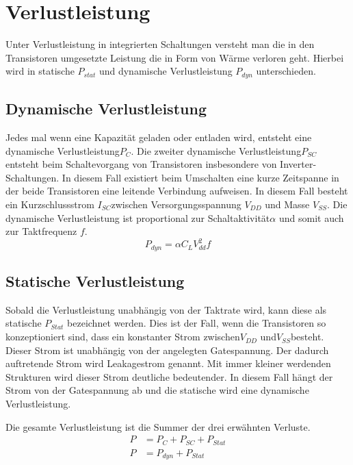 \section{Verlustleistung}
\label{sec:verlustleistung}
Unter Verlustleistung in integrierten Schaltungen versteht man die in den Transistoren umgesetzte Leistung die in Form von Wärme verloren geht.
Hierbei wird in statische \(P_{stat}\) und dynamische Verlustleistung \(P_{dyn}\) unterschieden. 
\subsection{Dynamische Verlustleistung}\label{subsec:dynVerl}
Jedes mal wenn eine Kapazität geladen oder entladen wird, entsteht eine dynamische Verlustleistung\(P_C\). Die zweiter dynamische Verlustleistung\(P_{SC}\) entsteht beim Schaltevorgang von Transistoren insbesondere von Inverter-Schaltungen. In diesem Fall existiert beim Umschalten eine kurze Zeitspanne in der beide Transistoren eine leitende Verbindung aufweisen. In diesem Fall besteht ein Kurzschlussstrom \(I_{SC}\)zwischen Versorgungsspannung \(V_{DD}\) und Masse \(V_{SS}\). Die dynamische Verlustleistung ist proportional zur Schaltaktivität\(\alpha\) und somit auch zur Taktfrequenz $f$.
\begin{equation}
P_{dyn} = \alpha  C_L  V_{dd}^{2}  f
\label{eq:dynVerlustleistung}
\end{equation}
\subsection{Statische Verlustleistung}\label{subsec:statVerl}
Sobald die Verlustleistung unabhängig von der Taktrate wird, kann diese als statische \(P_{Stat}\) bezeichnet werden. Dies ist der Fall, wenn die Transistoren so konzeptioniert sind, dass ein konstanter Strom zwischen\(V_{DD}\) und\(V_{SS}\)besteht. Dieser Strom ist unabhängig von der angelegten Gatespannung. Der dadurch auftretende Strom wird Leakagestrom genannt. Mit immer kleiner werdenden Strukturen wird dieser Strom deutliche bedeutender. In diesem Fall hängt der Strom von der Gatespannung ab und die statische wird eine dynamische Verlustleistung.


Die gesamte Verlustleistung ist die Summer der drei erwähnten Verluste.
\begin{equation}
\begin{aligned}
P &= P_{ C }+P_{ SC }+P_{ Stat}\\
P &= P_{dyn}+P_{Stat}
\label{eq:verlustleistung}
\end{aligned}
\end{equation}

